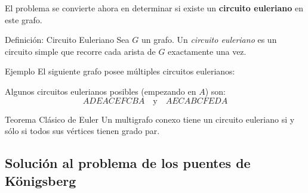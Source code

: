 \begin{center}
\end{center}

El problema se convierte ahora en determinar si existe un \textbf{circuito euleriano} en este grafo.

\medskip

\begin{definitionblock}{Definición: Circuito Euleriano}
Sea $G$ un grafo. Un \emph{circuito euleriano} es un circuito simple que recorre cada arista de $G$ exactamente una vez.
\end{definitionblock}

\begin{exampleblock}{Ejemplo}
El siguiente grafo posee múltiples circuitos eulerianos:

\begin{center}
\end{center}

Algunos circuitos eulerianos posibles (empezando en $A$) son:
\[
ADEACEFCBA \quad \text{y} \quad AECABCFEDA
\]
\end{exampleblock}

\begin{thmblock}{Teorema Clásico de Euler}
Un multigrafo conexo tiene un circuito euleriano si y sólo si todos sus vértices tienen grado par.
\end{thmblock}

\subsection{Solución al problema de los puentes de Königsberg}

